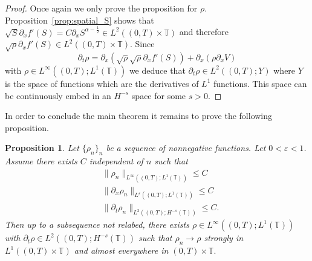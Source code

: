 \documentclass[a4paper,twosided, 11pt]{article}
\newcommand {\T}  { {\mathbb{T}} }
\newcommand {\p}   {\partial}
\theoremstyle{plain}
\newtheorem{proposition}[thm]{Proposition}
\theoremstyle{remark}
\numberwithin{equation}{section}
\begin{document}
\begin{proof}
Once again we only prove the proposition for $\rho$. Proposition~\ref{prop:spatial_S} shows that $\sqrt{S}\partial_x f'(S)= C\partial_x S^{\alpha-\frac{1}{2}}\in L^{2}((0,T)\times \T)$ and therefore $\sqrt{\rho}\partial_x f'(S)\in L^{2}((0,T)\times \T)$. 
Since 
$$
\partial_t \rho = \p_x(\sqrt{\rho}\sqrt{\rho}\partial_xf'(S)) + \p_x(\rho\p_xV)
$$
with $\rho\in L^{\infty}((0,T); L^{1}(\T))$ we deduce that $\partial_t \rho \in L^{2}((0,T); Y)$ where $Y$ is the space of functions which are the derivatives of $L^1$ functions. This space can be continuously embed in an $H^{-s}$ space for some $s>0$.  
\end{proof}

In order to conclude the main theorem it remains to prove the following proposition. 

\begin{proposition}\label{prop:Aubin-Lions}
Let $\{\rho_n\}_n$ be a sequence of nonnegative functions. Let $0<\varepsilon<1 $. Assume there exists $C$ independent of $n$ such that
\begin{align*}
&\|\rho_n\|_{L^{\infty}((0,T); L^{1}(\T)) }\le C\\
& \|\partial_x\rho_n\|_{L^{\varepsilon}((0,T); L^{1}(\T))}\le C\\
&\|\partial_t \rho_n\|_{L^{2}((0,T); H^{-s}(\T))}\le C.
\end{align*}
Then up to a subsequence not relabed, there exists $\rho\in L^{\infty}((0,T); L^{1}(\T))$ with $\partial_t\rho\in L^{2}((0,T); H^{-s}(\T))$ such that $\rho_n\to \rho$ strongly in $L^{1}((0,T)\times \T)$ and almost everywhere in $(0,T)\times\T.$
\end{proposition}
\end{document}

